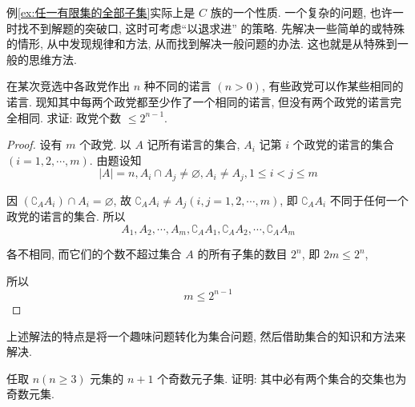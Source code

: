 \begin{analysis}
	例\ref{ex:任一有限集的全部子集}实际上是 $C$ 族的一个性质. 一个复杂的问题, 也许一时找不到解题的突破口, 这时可考虑“以退求进” 的策略. 先解决一些简单的或特殊的情形, 从中发现规律和方法, 从而找到解决一般问题的办法. 这也就是从特殊到一般的思维方法.
\end{analysis}

\begin{example}
	在某次竞选中各政党作出 $n$ 种不同的诺言 $(n>0)$, 有些政党可以作某些相同的诺言. 现知其中每两个政党都至少作了一个相同的诺言, 但没有两个政党的诺言完全相同. 求证: 政党个数 $\leqslant 2^{n-1}$.
\end{example}

\begin{proof}
	设有 $m$ 个政党. 以 $A$ 记所有诺言的集合, $A_{i}$ 记第 $i$ 个政党的诺言的集合 $(i=1,2, \cdots, m)$. 由题设知
	$$
		|A|=n, A_{i} \cap A_{j} \neq \varnothing, A_{i} \neq A_{j}, 1 \leqslant i<j \leqslant m
	$$

	因 $\left(\complement_{A} A_{i}\right) \cap A_{i}=\varnothing$, 故 $\complement_{A} A_{i} \neq A_{j}(i, j=1,2, \cdots, m)$, 即 $\complement_{A} A_{i}$ 不同于任何一个政党的诺言的集合. 所以
	$$
		A_{1}, A_{2}, \cdots, A_{m}, \complement_{A} A_{1}, \complement_{A} A_{2}, \cdots, \complement_{A} A_{m}
	$$

	各不相同, 而它们的个数不超过集合 $A$ 的所有子集的数目 $2^{n}$, 即 $2 m \leqslant 2^{n}$,

	所以
	$$
		m \leqslant 2^{n-1}
	$$
\end{proof}

\begin{note}
	上述解法的特点是将一个趣味问题转化为集合问题, 然后借助集合的知识和方法来解决.
\end{note}

\begin{example}
	任取 $n(n \geqslant 3)$ 元集的 $n+1$ 个奇数元子集. 证明: 其中必有两个集合的交集也为奇数元集.
\end{example}

